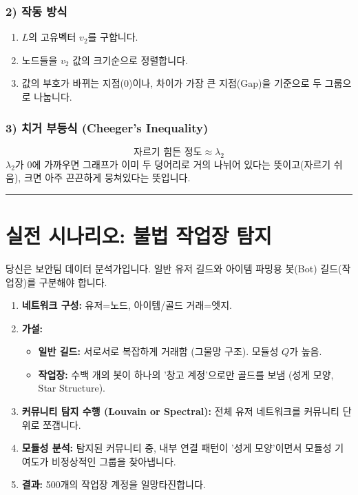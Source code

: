 \documentclass[11pt,a4paper]{book}
\theoremstyle{definition}
\begin{document}
\subsubsection*{2) 작동 방식}

\begin{enumerate}
    \item $L$의 고유벡터 $v_2$를 구합니다.
    \item 노드들을 $v_2$ 값의 크기순으로 정렬합니다.
    \item 값의 부호가 바뀌는 지점($0$)이나, 차이가 가장 큰 지점(Gap)을 기준으로 두 그룹으로 나눕니다.
\end{enumerate}

\subsubsection*{3) 치거 부등식 (Cheeger's Inequality)}
$$ \text{자르기 힘든 정도} \approx \lambda_2 $$
$\lambda_2$가 0에 가까우면 그래프가 이미 두 덩어리로 거의 나뉘어 있다는 뜻이고(자르기 쉬움), 크면 아주 끈끈하게 뭉쳐있다는 뜻입니다.

\vspace{0.5cm}\hrule\vspace{0.5cm}

\section{실전 시나리오: 불법 작업장 탐지}

\begin{storybox}[title={Scenario: 넥슨 게임 내 '작업장' 길드 색출}]
당신은 보안팀 데이터 분석가입니다. 일반 유저 길드와 아이템 파밍용 봇(Bot) 길드(작업장)를 구분해야 합니다.
\end{storybox}

\begin{enumerate}
    \item \textbf{네트워크 구성:} 유저=노드, 아이템/골드 거래=엣지.
    \item \textbf{가설:}
    \begin{itemize}
        \item \textbf{일반 길드:} 서로서로 복잡하게 거래함 (그물망 구조). 모듈성 $Q$가 높음.
        \item \textbf{작업장:} 수백 개의 봇이 하나의 '창고 계정'으로만 골드를 보냄 (성게 모양, Star Structure).
    \end{itemize}
    \item \textbf{커뮤니티 탐지 수행 (Louvain or Spectral):}
    전체 유저 네트워크를 커뮤니티 단위로 쪼갭니다.
    \item \textbf{모듈성 분석:}
    탐지된 커뮤니티 중, 내부 연결 패턴이 '성게 모양'이면서 모듈성 기여도가 비정상적인 그룹을 찾아냅니다.
    \item \textbf{결과:} 500개의 작업장 계정을 일망타진합니다.
\end{enumerate}
\end{document}

